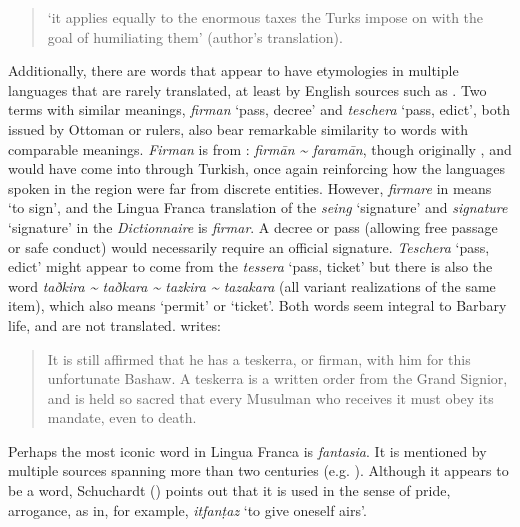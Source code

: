 \documentclass[output=paper]{langsci/langscibook}
\begin{document}
	\begin{quote}
		‘it applies equally to the enormous taxes the Turks impose on  with the goal of humiliating them’ (author's translation).
	\end{quote}
	
	Additionally, there are words that appear to have etymologies in multiple languages that are rarely translated, at least by English sources such as \citet{Tully1819}. Two terms with similar meanings, \textit{firman} ‘pass, decree’ and \textit{teschera} ‘pass, edict’, both issued by Ottoman or  rulers, also bear remarkable similarity to  words with comparable meanings. \textit{Firman} is from : \textit{firmān {\textasciitilde} faramān}, though originally , and would have come into  through  {Turkish}, once again reinforcing how the languages spoken in the region were far from discrete entities. However, \textit{firmare} in  means `to sign', and the Lingua Franca translation of the  \textit{seing} ‘signature’ and \textit{signature} ‘signature’ in the \textit{Dictionnaire} is \textit{firmar}. A decree or pass (allowing free passage or safe conduct) would necessarily require an official signature. \textit{Teschera} ‘pass, edict’ might appear to come from the  \textit{tessera} ‘pass, ticket’ but there is also the  word \textit{taðkira {\textasciitilde} taðkara {\textasciitilde} tazkira {\textasciitilde} tazakara} (all variant realizations of the same item), which also means ‘permit’ or ‘ticket’. Both words seem integral to Barbary life, and are not translated. \citet[258]{Tully1819} writes: 
	
	\begin{quote}
		It is still affirmed that he has a teskerra, or firman, with him for this unfortunate Bashaw. A teskerra is a written order from the Grand Signior, and is held so sacred that every Musulman who receives it must obey its mandate, even to death.
	\end{quote}
	
	Perhaps the most iconic word in Lingua Franca is \textit{fantasia}. It is mentioned by multiple sources spanning more than two centuries (e.g. \citealt{Haedo1612,Broughton1839}). Although it appears to be a  word, Schuchardt (\citeyear[71]{Schuchardt1909}) points out that it is used in the  sense of pride, arrogance, as in, for example,  \textit{itfanṭaz} ‘to give oneself airs’.
	
\end{document}
